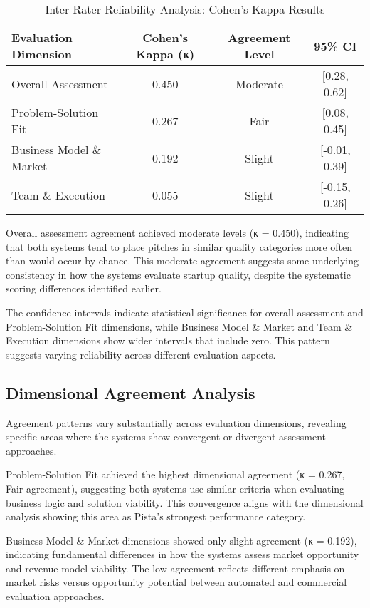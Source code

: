 \begin{table}[ht]
    \centering
    \caption{Inter-Rater Reliability Analysis: Cohen's Kappa Results}
    \label{tab:kappa-results}
    \begin{tabular}{lccc}
        \toprule
        \textbf{Evaluation Dimension} & \textbf{Cohen's Kappa (κ)} & \textbf{Agreement Level} & \textbf{95\% CI} \\
        \midrule
        Overall Assessment & 0.450 & Moderate & [0.28, 0.62] \\
        Problem-Solution Fit & 0.267 & Fair & [0.08, 0.45] \\
        Business Model \& Market & 0.192 & Slight & [-0.01, 0.39] \\
        Team \& Execution & 0.055 & Slight & [-0.15, 0.26] \\
        \bottomrule
    \end{tabular}
\end{table}

Overall assessment agreement achieved moderate levels (κ = 0.450), indicating that both systems tend to place pitches in similar quality categories more often than would occur by chance. This moderate agreement suggests some underlying consistency in how the systems evaluate startup quality, despite the systematic scoring differences identified earlier.

The confidence intervals indicate statistical significance for overall assessment and Problem-Solution Fit dimensions, while Business Model \& Market and Team \& Execution dimensions show wider intervals that include zero. This pattern suggests varying reliability across different evaluation aspects.

\subsection{Dimensional Agreement Analysis}
\label{subsec:dimensional-agreement}

Agreement patterns vary substantially across evaluation dimensions, revealing specific areas where the systems show convergent or divergent assessment approaches.

Problem-Solution Fit achieved the highest dimensional agreement (κ = 0.267, Fair agreement), suggesting both systems use similar criteria when evaluating business logic and solution viability. This convergence aligns with the dimensional analysis showing this area as Pista's strongest performance category.

Business Model \& Market dimensions showed only slight agreement (κ = 0.192), indicating fundamental differences in how the systems assess market opportunity and revenue model viability. The low agreement reflects different emphasis on market risks versus opportunity potential between automated and commercial evaluation approaches.

